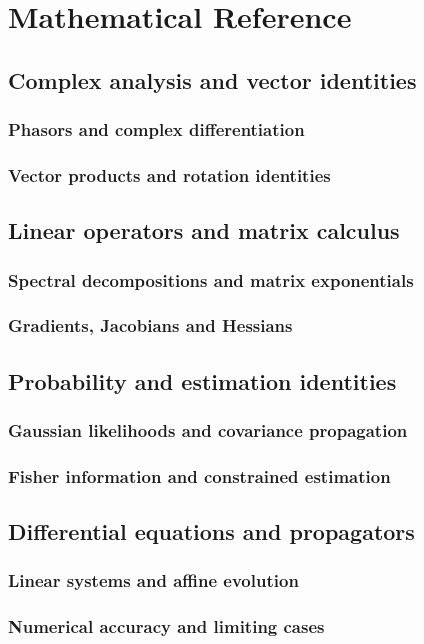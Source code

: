\chapter{Mathematical Reference}
\label{app:a}

\section{Complex analysis and vector identities}
\label{sec:a:complex-analysis-and-vector-identities}
\subsection{Phasors and complex differentiation}
\subsection{Vector products and rotation identities}

\section{Linear operators and matrix calculus}
\label{sec:a:linear-operators-and-matrix-calculus}
\subsection{Spectral decompositions and matrix exponentials}
\subsection{Gradients, Jacobians and Hessians}

\section{Probability and estimation identities}
\label{sec:a:probability-and-estimation-identities}
\subsection{Gaussian likelihoods and covariance propagation}
\subsection{Fisher information and constrained estimation}

\section{Differential equations and propagators}
\label{sec:a:differential-equations-and-propagators}
\subsection{Linear systems and affine evolution}
\subsection{Numerical accuracy and limiting cases}
